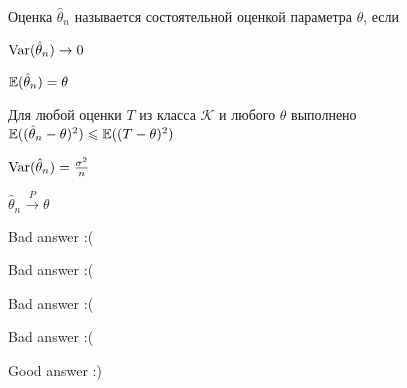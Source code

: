 
\begin{question}
Оценка \(\hat\theta_n\) называется состоятельной оценкой параметра
\(\theta\), если
\begin{answerlist}
  \item \(\operatorname{Var}(\hat\theta_n) \to 0\)
  \item \(\operatorname{\mathbb{E}}(\hat\theta_n)=\theta\)
  \item Для любой оценки \(T\) из класса \(\mathcal{K}\) и любого \(\theta\)
выполнено \(\operatorname{\mathbb{E}}((\hat\theta_n-\theta)^2)\leqslant \operatorname{\mathbb{E}}((T-\theta)^2)\)
  \item \(\operatorname{Var}(\hat\theta_n)=\frac{\sigma^2}{n}\)
  \item \(\hat\theta_n \xrightarrow{P}\theta\)
\end{answerlist}
\end{question}

\begin{solution}
\begin{answerlist}
  \item Bad answer :(
  \item Bad answer :(
  \item Bad answer :(
  \item Bad answer :(
  \item Good answer :)
\end{answerlist}
\end{solution}

